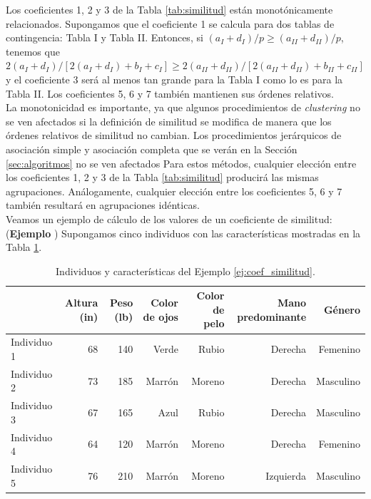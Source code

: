 \documentclass[a4paper, 20pt]{article}
\newcounter{EJCounter}
\newcommand{\ej}[1]{\refstepcounter{EJCounter}\textbf{\rmfamily Ejemplo \theEJCounter}\label{#1}}
\begin{document}
Los coeficientes 1, 2 y 3 de la Tabla \ref{tab:similitud} están monotónicamente relacionados. Supongamos que el coeficiente 1 se calcula para dos tablas de contingencia: Tabla I y Tabla II. Entonces, si $(a_I+d_I)/p \geq (a_{II}+d_{II})/p$, tenemos que $2(a_I+d_I)/[2(a_I+d_I)+b_I+c_I] \geq 2(a_{II}+d_{II})/[2(a_{II}+d_{II})+b_{II}+c_{II}]$ y el coeficiente 3 será al menos tan grande para la Tabla I como lo es para la Tabla II. Los coeficientes 5, 6 y 7 también mantienen sus órdenes relativos.\\

La monotonicidad es importante, ya que algunos procedimientos de \textit{clustering} no se ven afectados si la definición de similitud se modifica de manera que los órdenes relativos de similitud no cambian. Los procedimientos jerárquicos de asociación simple y asociación completa que se verán en la Sección \ref{sec:algoritmos} no se ven afectados Para estos métodos, cualquier elección entre los coeficientes 1, 2 y 3 de la Tabla \ref{tab:similitud} producirá las mismas agrupaciones. Análogamente, cualquier elección entre los coeficientes 5, 6 y 7 también resultará en agrupaciones idénticas.\\ %

Veamos un ejemplo de cálculo de los valores de un coeficiente de similitud: \\
(\ej{ej:coef_similitud}) Supongamos cinco individuos con las características mostradas en la Tabla \ref{tab:ej-similitud}.

\begin{table}[h]
  \centering
  \caption{Individuos y características del Ejemplo \ref{ej:coef_similitud}.}
  \label{tab:ej-similitud}
\resizebox{15cm}{!} {
  \begin{tabular}{lrrrrrr}
    \toprule
            & Altura (in) & Peso (lb) & Color de ojos & Color de pelo & Mano predominante & Género \\ \midrule
Individuo 1 & 68                       & 140                    & Verde                             & Rubio                             & Derecha                               & Femenino\\
Individuo 2 & 73 & 185 & Marrón & Moreno & Derecha & Masculino                  \\
Individuo 3 & 67 & 165 & Azul & Rubio & Derecha & Masculino                  \\
Individuo 4 & 64 & 120 & Marrón & Moreno                            & Derecha & Femenino \\
Individuo 5 & 76 & 210 & Marrón & Moreno & Izquierda & Masculino                 
\end{tabular}
}
\end{table}
\end{document}
